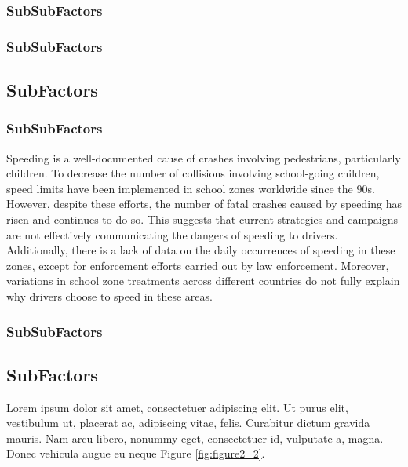 \subsubsection{SubSubFactors}
\lipsum[5-7]


\subsubsection{SubSubFactors}
\lipsum[8-9]

\subsection{SubFactors}
\lipsum[1]


\subsubsection{SubSubFactors}
Speeding is a well-documented cause of crashes involving pedestrians, particularly children. To decrease the number of collisions involving school-going children, speed limits have been implemented in school zones worldwide since the 90s. However, despite these efforts, the number of fatal crashes caused by speeding has risen and continues to do so. This suggests that current strategies and campaigns are not effectively communicating the dangers of speeding to drivers. Additionally, there is a lack of data on the daily occurrences of speeding in these zones, except for enforcement efforts carried out by law enforcement. Moreover, variations in school zone treatments across different countries do not fully explain why drivers choose to speed in these areas.

\lipsum[7-8]

\subsubsection{SubSubFactors}

\lipsum

\subsection{SubFactors}
Lorem ipsum dolor sit amet, consectetuer adipiscing elit. Ut purus elit, vestibulum ut, placerat ac, adipiscing vitae, felis. Curabitur dictum gravida mauris. Nam arcu libero, nonummy eget, consectetuer id, vulputate a, magna. Donec vehicula augue eu neque Figure \ref{fig:figure2_2}.



